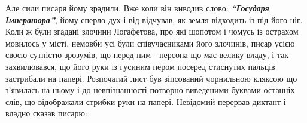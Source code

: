 \documentclass[a4paper,20pt]{report}
\begin{document}









Але сили писаря йому зрадили. Вже коли він виводив слово: \textbf{\em ``Государя Імператора''},
йому сперло дух і від відчував, як земля відходить із-під його ніг. Коли ж були
згадані злочини Логафетова, про які шопотом і чомусь із острахом мовилось у місті, немовби
усі були співучасниками його злочинів, писар усією своєю сутністю зрозумів, що перед ним - 
персона що має велику владу, і так захвилювався, що його руки із гусиним пером посеред
стиснутих пальців застрибали на папері. Розпочатий лист був зіпсований чорнильною кляксою що з'явилась на ньому
і до невпізнанності потворно виведеними буквами останніх слів, що відображали стрибки руки на папері.
Невідомий перервав диктант і владно сказав писарю:
\end{document}

